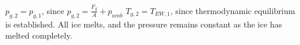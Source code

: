 \( p_{g,2} = p_{g,1} \), since \( p_{g,2} = \frac{F_g}{A} + p_{amb} \)  
\( T_{g,2} = T_{EW,1} \), since thermodynamic equilibrium is established.  
All ice melts, and the pressure remains constant as the ice has melted completely.